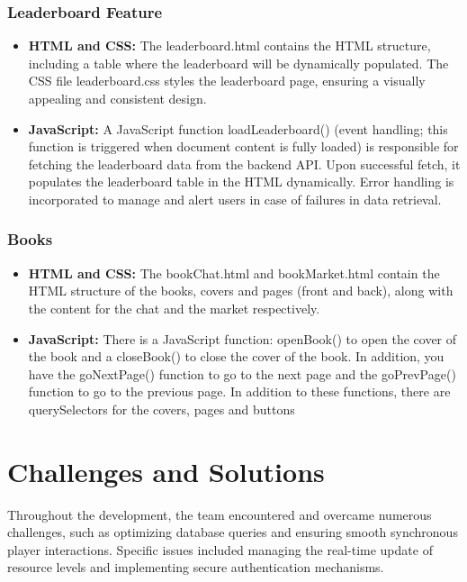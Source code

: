 \documentclass[12pt]{article}
\begin{document}
\subsubsection{Leaderboard Feature}
\begin{itemize}
    \item \textbf{HTML and CSS:} The leaderboard.html contains the HTML structure, including a table where the leaderboard will be dynamically populated. The CSS file leaderboard.css styles the leaderboard page, ensuring a visually appealing and consistent design.
    \item \textbf{JavaScript:} A JavaScript function loadLeaderboard() (event handling; this function is triggered when document content is fully loaded) is responsible for fetching the leaderboard data from the backend API. Upon successful fetch, it populates the leaderboard table in the HTML dynamically. Error handling is incorporated to manage and alert users in case of failures in data retrieval.
\end{itemize}

\subsubsection{Books}
\begin{itemize}
    \item \textbf{HTML and CSS:} The bookChat.html and bookMarket.html contain the HTML structure of the books, covers and pages (front and back), along with the content for the chat and the market respectively.
    \item \textbf{JavaScript:} There is a JavaScript function: openBook() to open the cover of the book and a closeBook() to close the cover of the book. In addition, you have the goNextPage() function to go to the next page and the goPrevPage() function to go to the previous page. In addition to these functions, there are querySelectors for the covers, pages and buttons
\end{itemize}

\section{Challenges and Solutions}
Throughout the development, the team encountered and overcame numerous challenges, such as optimizing database queries and ensuring smooth synchronous player interactions. Specific issues included managing the real-time update of resource levels and implementing secure authentication mechanisms.
\end{document}
